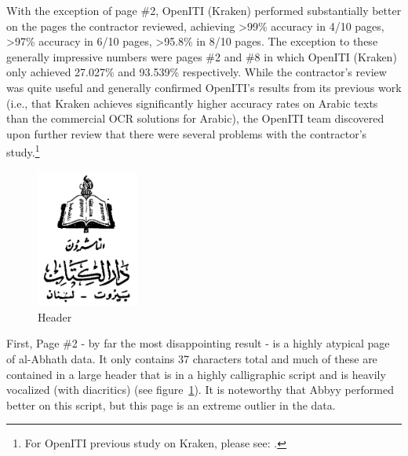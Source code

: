 With the exception of page \#2, OpenITI (Kraken) performed substantially better
on the pages the contractor reviewed, achieving >99\% accuracy in 4/10 pages,
>97\% accuracy in 6/10 pages, >95.8\% in 8/10 pages. The exception to these
generally impressive numbers were pages \#2 and \#8 in which OpenITI (Kraken)
only achieved 27.027\% and 93.539\% respectively. While the contractor’s review
was quite useful and generally confirmed OpenITI’s results from its previous
work (i.e., that Kraken achieves significantly higher accuracy rates on Arabic
texts than the commercial OCR solutions for Arabic), the OpenITI team
discovered upon further review that there were several problems with the
contractor’s study.\footnote{For OpenITI previous study on Kraken, please see:
\cite{kiessling2017important}.}

\begin{figure}
	\includegraphics[width=0.3\textwidth]{images/image18.jpg}
	\caption{Header}
	\label{fig3:fig3}
\end{figure}

First, Page \#2 - by far the most disappointing result - is a highly atypical
page of al-Abhath data. It only contains 37 characters total and much of these
are contained in a large header that is in a highly calligraphic script and is
heavily vocalized (with diacritics) (see figure~\ref{fig3:fig3}). It is
noteworthy that Abbyy performed better on this script, but this page is an
extreme outlier in the data.

